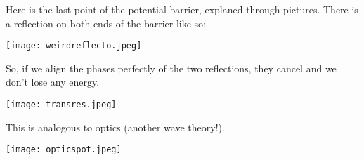Here is the last point of the potential barrier, explaned through pictures. There is a reflection
on both ends of the barrier like so:

\texttt{[image: weirdreflecto.jpeg]}

So, if we align the phases perfectly of the two reflections, they cancel and we don't lose any energy.

\texttt{[image: transres.jpeg]}

This is analogous to optics (another wave theory!).

\texttt{[image: opticspot.jpeg]}
